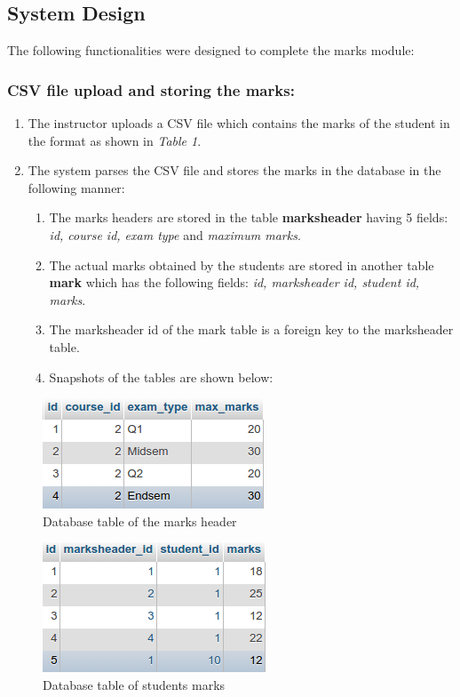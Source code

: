 \subsection{System Design}

The following functionalities were designed to complete the marks module:

\subsubsection*{CSV file upload and storing the marks:}

\begin{enumerate}
	\item The instructor uploads a CSV file which contains the marks of the student in the format as shown in \textit{Table 1}.
	\item The system parses the CSV file and stores the marks in the database in the following manner:
	\begin{enumerate}
		\item The marks headers are stored in the table \textbf{marksheader} having 5 fields: \textit{id, course id, exam type} and \textit{maximum marks}.
		\item The actual marks obtained by the students are stored in another table \textbf{mark} which has the following fields: \textit{id, marksheader id, student id, marks}.
		\item The marksheader id of the mark table is a foreign key to the marksheader table.
		\item Snapshots of the tables are shown below:
	\end{enumerate}
\end{enumerate}
\newpage		
	\begin{figure}[h]
	\centering
	\includegraphics[width=0.4\linewidth]{./media/MarksHeader}
	\caption{Database table of the marks header}
	\label{fig:MarksHeader}
	\end{figure}
	\begin{figure}[h]
	\centering
	\includegraphics[width=0.4\linewidth]{./media/mark}
	\caption{Database table of students marks}
	\label{fig:mark}
	\end{figure}

